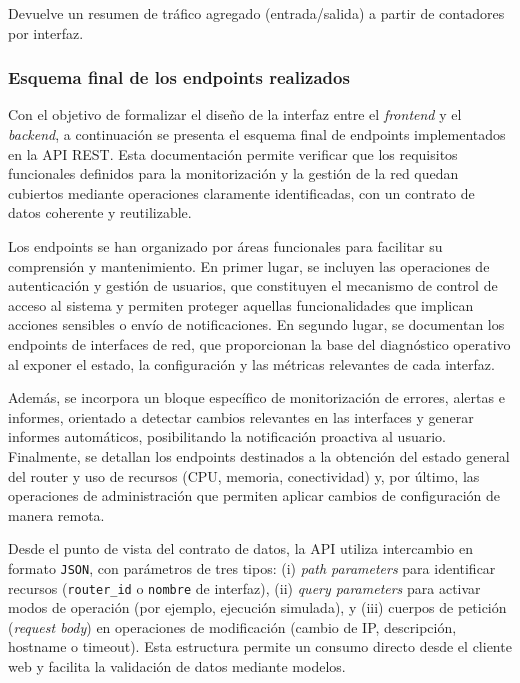 Devuelve un resumen de tráfico agregado (entrada/salida) a partir de contadores por interfaz.

\subsubsection*{Esquema final de los endpoints realizados}

Con el objetivo de formalizar el diseño de la interfaz entre el \textit{frontend} y el \textit{backend}, a continuación se presenta el esquema final de endpoints implementados en la API REST. Esta documentación permite verificar que los requisitos funcionales definidos para la monitorización y la gestión de la red quedan cubiertos mediante operaciones claramente identificadas, con un contrato de datos coherente y reutilizable.

Los endpoints se han organizado por áreas funcionales para facilitar su comprensión y mantenimiento. En primer lugar, se incluyen las operaciones de autenticación y gestión de usuarios, que constituyen el mecanismo de control de acceso al sistema y permiten proteger aquellas funcionalidades que implican acciones sensibles o envío de notificaciones. En segundo lugar, se documentan los endpoints de interfaces de red, que proporcionan la base del diagnóstico operativo al exponer el estado, la configuración y las métricas relevantes de cada interfaz.

Además, se incorpora un bloque específico de monitorización de errores, alertas e informes, orientado a detectar cambios relevantes en las interfaces y generar informes automáticos, posibilitando la notificación proactiva al usuario. Finalmente, se detallan los endpoints destinados a la obtención del estado general del router y uso de recursos (CPU, memoria, conectividad) y, por último, las operaciones de administración que permiten aplicar cambios de configuración de manera remota.

Desde el punto de vista del contrato de datos, la API utiliza intercambio en formato \texttt{JSON}, con parámetros de tres tipos: (i) \textit{path parameters} para identificar recursos (\texttt{router\_id} o \texttt{nombre} de interfaz), (ii) \textit{query parameters} para activar modos de operación (por ejemplo, ejecución simulada), y (iii) cuerpos de petición (\textit{request body}) en operaciones de modificación (cambio de IP, descripción, hostname o timeout). Esta estructura permite un consumo directo desde el cliente web y facilita la validación de datos mediante modelos.


